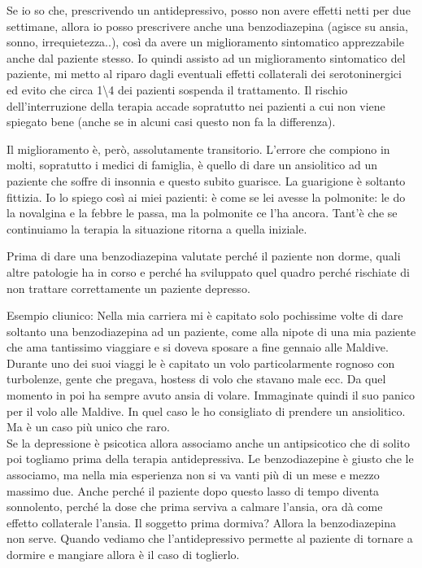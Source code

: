 \begin{itemize}
Se io so che, prescrivendo un antidepressivo, posso non avere effetti
netti per due settimane, allora io posso prescrivere anche una
benzodiazepina (agisce su ansia, sonno, irrequietezza..), così da avere
un miglioramento sintomatico apprezzabile anche dal paziente stesso. Io
quindi assisto ad un miglioramento sintomatico del paziente, mi metto al
riparo dagli eventuali effetti collaterali dei serotoninergici ed evito
che circa 1\textbackslash{}4 dei pazienti sospenda il trattamento. Il
rischio dell'interruzione della terapia accade sopratutto nei pazienti a
cui non viene spiegato bene (anche se in alcuni casi questo non fa la
differenza).

Il miglioramento è, però, assolutamente transitorio. L'errore che
compiono in molti, sopratutto i medici di famiglia, è quello di dare un
ansiolitico ad un paziente che soffre di insonnia e questo subito
guarisce. La guarigione è soltanto fittizia. Io lo spiego così ai miei
pazienti: è come se lei avesse la polmonite: le do la novalgina e la
febbre le passa, ma la polmonite ce l'ha ancora. Tant'è che se
continuiamo la terapia la situazione ritorna a quella iniziale.

Prima di dare una benzodiazepina valutate perché il paziente non dorme,
quali altre patologie ha in corso e perché ha sviluppato quel quadro
perché rischiate di non trattare correttamente un paziente depresso.

Esempio cliunico: Nella mia carriera mi è capitato solo pochissime volte
di dare soltanto una benzodiazepina ad un paziente, come alla nipote di
una mia paziente che ama tantissimo viaggiare e si doveva sposare a fine
gennaio alle Maldive. Durante uno dei suoi viaggi le è capitato un volo
particolarmente rognoso con turbolenze, gente che pregava, hostess di
volo che stavano male ecc. Da quel momento in poi ha sempre avuto ansia
di volare. Immaginate quindi il suo panico per il volo alle Maldive. In
quel caso le ho consigliato di prendere un ansiolitico. Ma è un caso più
unico che raro.\\
Se la depressione è psicotica allora associamo anche un antipsicotico
che di solito poi togliamo prima della terapia antidepressiva. Le
benzodiazepine è giusto che le associamo, ma nella mia esperienza non si
va vanti più di un mese e mezzo massimo due. Anche perché il paziente
dopo questo lasso di tempo diventa sonnolento, perché la dose che prima
serviva a calmare l'ansia, ora dà come effetto collaterale l'ansia. Il
soggetto prima dormiva? Allora la benzodiazepina non serve. Quando
vediamo che l'antidepressivo permette al paziente di tornare a dormire e
mangiare allora è il caso di toglierlo.
\end{itemize}

